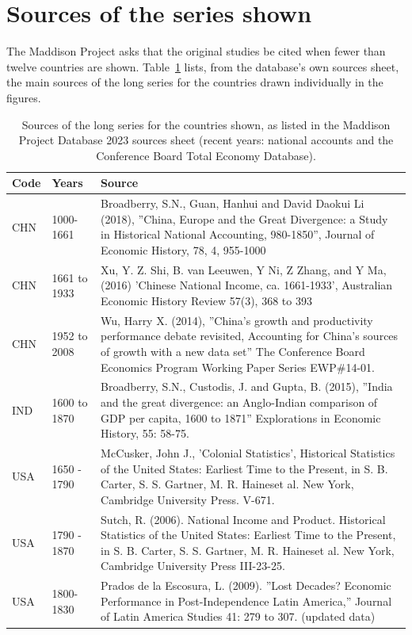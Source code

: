 \documentclass[11pt,a4paper]{article}
\begin{document}
\appendix
\section{Sources of the series shown}
The Maddison Project asks that the original studies be cited when fewer than twelve countries are shown. Table~\ref{tab:src} lists, from the database's own sources sheet, the main sources of the long series for the countries drawn individually in the figures.

\begin{longtable}{lp{2.2cm}p{11cm}}\caption{Sources of the long series for the countries shown, as listed in the Maddison Project Database 2023 sources sheet (recent years: national accounts and the Conference Board Total Economy Database).}\label{tab:src}\\\toprule Code & Years & Source\\\midrule\endhead
CHN & 1000-1661 & Broadberry, S.N., Guan, Hanhui and David Daokui Li (2018), ''China, Europe and the Great Divergence: a Study in Historical National Accounting, 980-1850'', Journal of Economic History, 78, 4, 955-1000\\
CHN & 1661 to 1933 & Xu, Y. Z. Shi, B. van Leeuwen, Y Ni, Z Zhang, and Y Ma, (2016) 'Chinese National Income, ca. 1661-1933', Australian Economic History Review 57(3), 368 to 393\\
CHN & 1952 to 2008 & Wu, Harry X. (2014), ''China's growth and productivity performance debate revisited, Accounting for China's sources of growth with a new data set'' The Conference Board Economics Program Working Paper Series EWP\#14-01.\\
IND & 1600 to 1870 & Broadberry, S.N., Custodis, J. and Gupta, B. (2015), ''India and the great divergence: an Anglo-Indian comparison of GDP per capita, 1600 to 1871'' Explorations in Economic History, 55: 58-75.\\
USA & 1650 - 1790 & McCusker, John J., 'Colonial Statistics', Historical Statistics of the United States: Earliest Time to the Present, in S. B. Carter, S. S. Gartner, M. R. Haineset al. New York, Cambridge University Press. V-671.\\
USA & 1790 - 1870 & Sutch, R. (2006). National Income and Product. Historical Statistics of the United States: Earliest Time to the Present, in S. B. Carter, S. S. Gartner, M. R. Haineset al. New York, Cambridge University Press III-23-25.\\
USA & 1800-1830 & Prados de la Escosura, L. (2009). ''Lost Decades? Economic Performance in Post-Independence Latin America,'' Journal of Latin America Studies 41: 279 to 307. (updated data)\\

\end{longtable}
\end{document}
